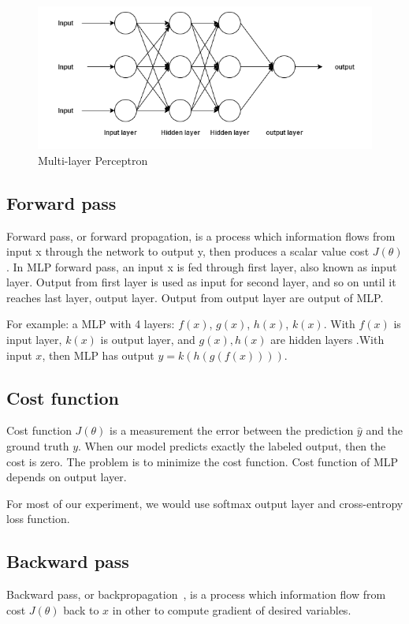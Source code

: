 \begin{figure}[H]
	\centering
	\includegraphics[width=0.7\linewidth]{figure/multilayerperceptron}
	\caption[Multi-layer Perceptron]{Multi-layer Perceptron}
	\label{fig:multilayerperceptron}
\end{figure}

\subsection{Forward pass}
Forward pass, or forward propagation, is a process which information flows from input x through the network to output y, then produces a scalar value cost $J(\theta)$.
In MLP forward pass, an input x is fed through first layer, also known as input layer.
Output from first layer is used as input for second layer, and so on until it reaches last layer, output layer. Output from output layer are output of MLP.

For example: a MLP with 4 layers: $f(x)$, $g(x)$, $h(x)$, $k(x)$. With $f(x)$ is input layer, $k(x)$ is output layer, and $g(x), h(x)$ are hidden layers .With input $x$, then MLP has output $ y = k(h(g(f(x))))$.

\subsection{Cost function}
Cost function $J(\theta)$  is a measurement the error between the prediction $\hat y$ and the ground truth $y$.
When our model predicts exactly the labeled output, then the cost is zero. The problem is to minimize the cost function.
Cost function of MLP depends on output layer.

For most of our experiment, we would use softmax output layer and cross-entropy loss function.

\subsection{Backward pass}
Backward pass, or backpropagation~\cite{rumelhart1988learning}, is a process which information flow from cost $J(\theta)$ back to $x$ in other to compute gradient of desired variables.


